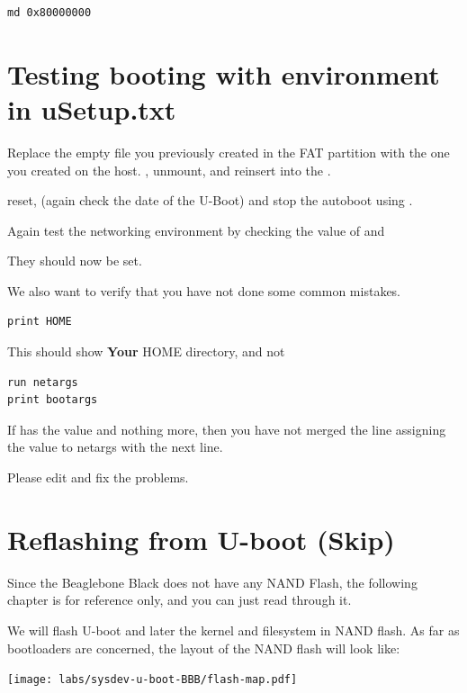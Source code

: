 \begin{verbatim}
md 0x80000000
\end{verbatim}

\clearpage
\section{Testing booting with environment in uSetup.txt}

Replace the empty  file you previously created in the FAT partition
with the one you created on the host.  , unmount, and reinsert into the
\devboard.

reset, (again check the date of the U-Boot) and stop the autoboot using .

Again test the networking environment by checking the value of  and 

They should now be set.

We also want to verify that you have not done some common mistakes.

\begin{verbatim}
print HOME
\end{verbatim}

This should show {\bf Your} HOME directory, and not 

\begin{verbatim}
run netargs
print bootargs
\end{verbatim}

If  has the value  and nothing
more, then you have not merged the line assigning the value to netargs with the next line.

Please edit  and fix the problems.

\clearpage
\section{Reflashing from U-boot (Skip)}

Since the Beaglebone Black does not have any NAND Flash, the following
chapter is for reference only, and you can just read through it.

We will flash U-boot and later the kernel and filesystem in NAND
flash. As far as bootloaders are concerned, the layout of the NAND
flash will look like:

\begin{center}
  \texttt{[image: labs/sysdev-u-boot-BBB/flash-map.pdf]}
\end{center}

